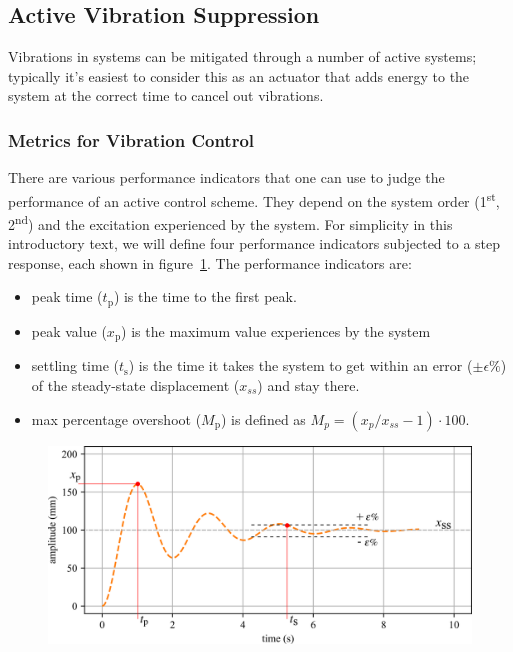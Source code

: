 \documentclass[12pt,letter]{article}
\begin{document}
\subsection{Active Vibration Suppression}

Vibrations in systems can be mitigated through a number of active systems; typically it's easiest to consider this as an actuator that adds energy to the system at the correct time to cancel out vibrations. 

\subsubsection{Metrics for Vibration Control}

There are various performance indicators that one can use to judge the performance of an active control scheme. They depend on the system order (1\textsuperscript{st}, 2\textsuperscript{nd}) and the excitation experienced by the system. For simplicity in this introductory text, we will define four performance indicators subjected to a step response, each shown in figure~\ref{fig:2nd_order_performance_indicators}. The performance indicators are:
\begin{itemize}[itemsep=0.25ex,topsep=0.25ex]
	\item peak time  ($t_\text{p}$) is the time to the first peak.
	\item peak value  ($x_\text{p}$) is the maximum value experiences by the system
	\item settling time ($t_\text{s}$) is the time it takes the system to get within an error ($\pm \epsilon \%$) of the steady-state displacement ($x_{ss}$) and stay there.
	\item max percentage overshoot ($M_\text{p}$) is defined as $M_p = ( {x_p} / {x_{ss}}-1 ) \cdot 100$.
\end{itemize}

\begin{figure}[H]
	\centering
	\includegraphics[]{../figures/2nd_order_performance_indicators}
	\label{fig:2nd_order_performance_indicators}
\end{figure}
\end{document}
